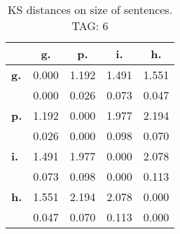 \begin{table}[h!]
\begin{center}
\begin{tabular}{| l || c | c | c | c |}\hline
 & {\bf g.} & {\bf p.} & {\bf i.} & {\bf h.} \\\hline\hline
{\bf g.} & 0.000 & 1.192 & 1.491 & 1.551 \\
{\bf } & 0.000 & 0.026 & 0.073 & 0.047 \\\hline
{\bf p.} & 1.192 & 0.000 & 1.977 & 2.194 \\
{\bf } & 0.026 & 0.000 & 0.098 & 0.070 \\\hline
{\bf i.} & 1.491 & 1.977 & 0.000 & 2.078 \\
{\bf } & 0.073 & 0.098 & 0.000 & 0.113 \\\hline
{\bf h.} & 1.551 & 2.194 & 2.078 & 0.000 \\
{\bf } & 0.047 & 0.070 & 0.113 & 0.000 \\\hline
\end{tabular}
\caption{KS distances on size of sentences. TAG: 6}
\end{center}
\end{table}